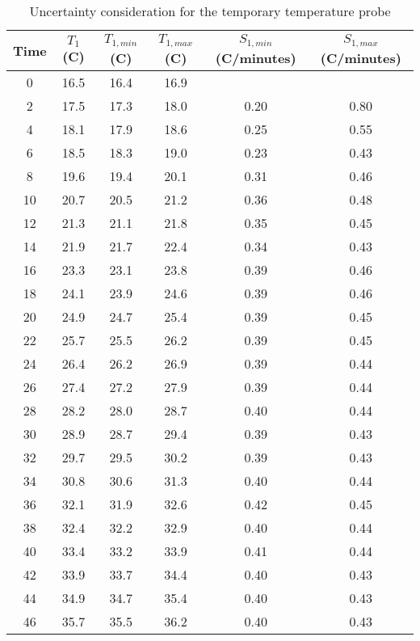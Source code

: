 \begin{table}[!htb]
	\centering
		\begin{tabular}{cccccc}
        \hline
		Time & $T_1$ (\degree C)   & $T_{1, min}$ (\degree C) & $T_{1, max}$ (\degree C) & $S_{1, min}$ (\degree C/minutes) & $S_{1, max}$ (\degree C/minutes) \\ \hline\hline
		0    & 16.5 & 16.4   & 16.9   &        &        \\
		2    & 17.5 & 17.3   & 18.0   & 0.20   & 0.80   \\
		4    & 18.1 & 17.9   & 18.6   & 0.25   & 0.55   \\
		6    & 18.5 & 18.3   & 19.0   & 0.23   & 0.43   \\
		8    & 19.6 & 19.4   & 20.1   & 0.31   & 0.46   \\
		10   & 20.7 & 20.5   & 21.2   & 0.36   & 0.48   \\
		12   & 21.3 & 21.1   & 21.8   & 0.35   & 0.45   \\
		14   & 21.9 & 21.7   & 22.4   & 0.34   & 0.43   \\
		16   & 23.3 & 23.1   & 23.8   & 0.39   & 0.46   \\
		18   & 24.1 & 23.9   & 24.6   & 0.39   & 0.46   \\
		20   & 24.9 & 24.7   & 25.4   & 0.39   & 0.45   \\
		22   & 25.7 & 25.5   & 26.2   & 0.39   & 0.45   \\
		24   & 26.4 & 26.2   & 26.9   & 0.39   & 0.44   \\
		26   & 27.4 & 27.2   & 27.9   & 0.39   & 0.44   \\
		28   & 28.2 & 28.0   & 28.7   & 0.40   & 0.44   \\
		30   & 28.9 & 28.7   & 29.4   & 0.39   & 0.43   \\
		32   & 29.7 & 29.5   & 30.2   & 0.39   & 0.43   \\
		34   & 30.8 & 30.6   & 31.3   & 0.40   & 0.44   \\
		36   & 32.1 & 31.9   & 32.6   & 0.42   & 0.45   \\
		38   & 32.4 & 32.2   & 32.9   & 0.40   & 0.44   \\
		40   & 33.4 & 33.2   & 33.9   & 0.41   & 0.44   \\
		42   & 33.9 & 33.7   & 34.4   & 0.40   & 0.43   \\
		44   & 34.9 & 34.7   & 35.4   & 0.40   & 0.43   \\
		46   & 35.7 & 35.5   & 36.2   & 0.40   & 0.43  
		\end{tabular}
        \caption{Uncertainty consideration for the temporary temperature probe}\label{tab:data_t1}
\end{table}



